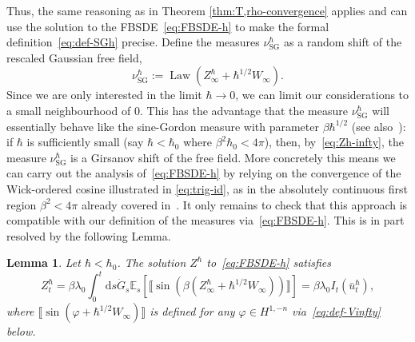\documentclass[11pt, a4paper]{scrartcl}
\numberwithin{equation}{section}
\theoremstyle{plain}
\newtheorem{lemma}[foo]{Lemma}
\theoremstyle{remark}
\newcommand{\assign}{:=}
\newcommand{\mathd}{\mathrm{d}}
\newcommand{\noplus}{}
\newcommand{\tmop}[1]{\ensuremath{\operatorname{#1}}}
\begin{document}
Thus, the same reasoning as in Theorem \ref{thm:T,rho-convergence} applies and
can use the solution to the FBSDE~\eqref{eq:FBSDE-h} to make the formal
definition~\eqref{eq:def-SGh} precise. Define the measures
$\nu_{\tmop{SG}}^{\hbar}$ as a random shift of the rescaled Gaussian free
field,
\[ \nu_{\tmop{SG}}^{\hbar} \assign \tmop{Law} (Z_{\infty}^{\hbar} \noplus
	\noplus + \hbar^{1 / 2} W_{\infty}) . \]
Since we are only interested in the limit $\hbar \rightarrow 0$, we can limit
our considerations to a small neighbourhood of $0$. This has the advantage
that the measure $\nu_{\tmop{SG}}^{\hbar}$ will essentially behave like the
sine-Gordon measure with parameter $\beta \hbar^{1 / 2}$ (see
also~{\cite[Section C]{colemanQuantumSineGordonEquation1975}}): if $\hbar$ is
sufficiently small (say $\hbar < \hbar_0$ where $\beta^2 \hbar_0 < 4 \pi$),
then, by~\eqref{eq:Zh-infty}, the measure $\nu_{\tmop{SG}}^{\hbar}$ is a
Girsanov shift of the free field. More concretely this means we can carry out
the analysis of~\eqref{eq:FBSDE-h} by relying on the convergence of the
Wick-ordered cosine illustrated in \eqref{eq:trig-id}, as in the absolutely
continuous first region $\beta^2 < 4 \pi$ already covered
in~{\cite{barashkovStochasticControlApproach2022}}. It only remains to check
that this approach is compatible with our definition of the measures
via~\eqref{eq:FBSDE-h}. This is in part resolved by the following Lemma.

\begin{lemma}
	\label{lem:Zhbar-wick}Let $\hbar < \hbar_0$. The solution $Z^{\hbar}$
	to~\eqref{eq:FBSDE-h} satisfies
	\begin{equation}
		Z^{\hbar}_t = \beta \lambda_0  \int_0^t \mathd s \dot{G}_s \mathbb{E}_s
		[\llbracket \sin (\beta (Z_{\infty}^{\hbar} + \hbar^{1 / 2} W_{\infty}))
		\rrbracket] \label{eq:Zhbar-wick} = \beta \lambda_0 I_t
		(\bar{u}^{\hbar}_t),
	\end{equation}
	where $\llbracket \sin (\varphi + \hbar^{1 / 2} W_{\infty}) \rrbracket$ is
	defined for any $\varphi \in H^{1, - n}$ via~\eqref{eq:def-Vinfty} below.
\end{lemma}
\end{document}
